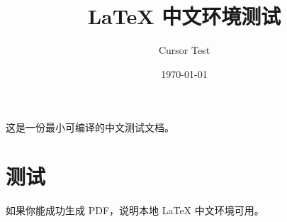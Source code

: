 \documentclass[UTF8]{ctexart}
\title{LaTeX 中文环境测试}
\author{Cursor Test}
\date{\today}
\begin{document}
\maketitle

这是一份最小可编译的中文测试文档。

\section{测试}
如果你能成功生成 PDF，说明本地 LaTeX 中文环境可用。
\end{document}
